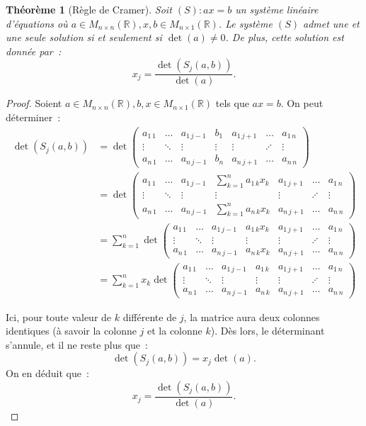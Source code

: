 \documentclass{article}
\newcommand{\R}{\mathbb R}
\newcommand{\M}[3]{M_{#1 \times #2}(#3)}
\newtheorem{thm}{Théorème}[section]
\theoremstyle{definition}
\theoremstyle{remark}
\begin{document}
		\begin{thm}[Règle de Cramer]\label{règleCramer} Soit $(S) : ax = b$ un système linéaire d'équations où $a \in \M nn\R, x, b \in \M n1\R$. Le système $(S)$
		admet une et une seule solution si et seulement si $\det(a) \neq 0$. De plus, cette solution est donnée par~:
		\[x_j = \frac {\det\left(S_j(a, b)\right)}{\det(a)}.\] \end{thm}

		\begin{proof} Soient $a \in \M nn\R, b, x \in \M n1\R$ tels que $ax = b$. On peut déterminer~:
		\[\begin{aligned}
			\det(S_j(a, b)) &= \det
				\begin{pmatrix}
					a_{1\,1} & \ldots & a_{1\,j-1} &   b_1  & a_{1\,j+1} & \ldots  & a_{1\,n} \\
					  \vdots & \ddots &   \vdots   & \vdots &   \vdots   & \iddots &   \vdots \\
					a_{n\,1} & \ldots & a_{n\,j-1} &   b_n  & a_{n\,j+1} & \ldots  & a_{n\,n}
				\end{pmatrix} \\
			&= \det
				\begin{pmatrix}
					a_{1\,1} & \ldots & a_{1\,j-1} &   \sum_{k=1}^na_{1\,k}x_k  & a_{1\,j+1} & \ldots  & a_{1\,n} \\
					  \vdots & \ddots &   \vdots   &           \vdots           &   \vdots   & \iddots &   \vdots \\
					a_{n\,1} & \ldots & a_{n\,j-1} &   \sum_{k=1}^na_{n\,k}x_k  & a_{n\,j+1} & \ldots  & a_{n\,n}
				\end{pmatrix} \\
			&= \sum_{k=1}^n
				\det
					\begin{pmatrix}
						a_{1\,1} & \ldots & a_{1\,j-1} &   a_{1\,k}x_k  & a_{1\,j+1} & \ldots  & a_{1\,n} \\
						  \vdots & \ddots &   \vdots   &     \vdots     &   \vdots   & \iddots &   \vdots \\
						a_{n\,1} & \ldots & a_{n\,j-1} &   a_{n\,k}x_k  & a_{n\,j+1} & \ldots  & a_{n\,n}
					\end{pmatrix} \\
			&= \sum_{k=1}^n
				x_k\det
					\begin{pmatrix}
						a_{1\,1} & \ldots & a_{1\,j-1} &   a_{1\,k}  & a_{1\,j+1} & \ldots  & a_{1\,n} \\
						  \vdots & \ddots &   \vdots   &   \vdots    &   \vdots   & \iddots &   \vdots \\
						a_{n\,1} & \ldots & a_{n\,j-1} &   a_{n\,k}  & a_{n\,j+1} & \ldots  & a_{n\,n}
					\end{pmatrix}
		\end{aligned}\]

		Ici, pour toute valeur de $k$ différente de $j$, la matrice aura deux colonnes identiques (à savoir la colonne $j$ et la colonne $k$). Dès lors, le déterminant
		s'annule, et il ne reste plus que~: \[\det(S_j(a, b)) = x_j\det(a).\] On en déduit que~: \[x_j = \frac {\det(S_j(a, b))}{\det(a)}.\] \end{proof}
\end{document}
